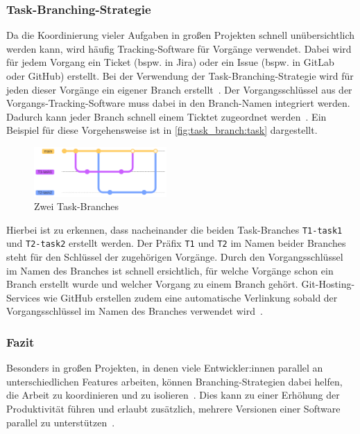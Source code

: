 \subsubsection{Task\hyp Branching\hyp Strategie}

Da die Koordinierung vieler Aufgaben in großen Projekten schnell unübersichtlich werden kann, wird häufig Tracking\hyp Software für Vorgänge verwendet. Dabei wird für jedem Vorgang ein Ticket (bspw. in Jira) oder ein Issue (bspw. in GitLab oder GitHub) erstellt. Bei der Verwendung der Task\hyp Branching\hyp Strategie wird für jeden dieser Vorgänge ein eigener Branch erstellt~\cite{atlassian_hintergrundwissen_2023}. Der Vorgangsschlüssel aus der Vorgangs\hyp Tracking\hyp Software muss dabei in den Branch\hyp Namen integriert werden. Dadurch kann jeder Branch schnell einem Ticktet zugeordnet werden~\cite{atlassian_hintergrundwissen_2023}. Ein Beispiel für diese Vorgehensweise ist in \autoref{fig:task_branch:task} dargestellt. 

\begin{figure}
    \includegraphics[width=0.45\textwidth]{src/assets/diagrams/task_branch/task-branch.pdf}
    \caption{Zwei Task\hyp Branches}
    \label{fig:task_branch:task}
\end{figure}

Hierbei ist zu erkennen, dass nacheinander die beiden Task\hyp Branches \texttt{T1-task1} und \texttt{T2-task2} erstellt werden. Der Präfix \texttt{T1} und \texttt{T2} im Namen beider Branches steht für den Schlüssel der zugehörigen Vorgänge.
Durch den Vorgangsschlüssel im Namen des Branches ist schnell ersichtlich, für welche Vorgänge schon ein Branch erstellt wurde und welcher Vorgang zu einem Branch gehört. Git\hyp Hosting\hyp Services wie GitHub erstellen zudem eine automatische Verlinkung sobald der Vorgangsschlüssel im Namen des Branches verwendet wird~\cite{github_inc_autolinked_2023}.


\subsubsection{Fazit}

Besonders in großen Projekten, in denen viele Entwickler:innen parallel an unterschiedlichen Features arbeiten, können Branching\hyp Strategien dabei helfen, die Arbeit zu koordinieren und zu isolieren~\cite{hart_besten_2020}. Dies kann zu einer Erhöhung der Produktivität führen und erlaubt zusätzlich, mehrere Versionen einer Software parallel zu unterstützen~\cite{hart_besten_2020}.
